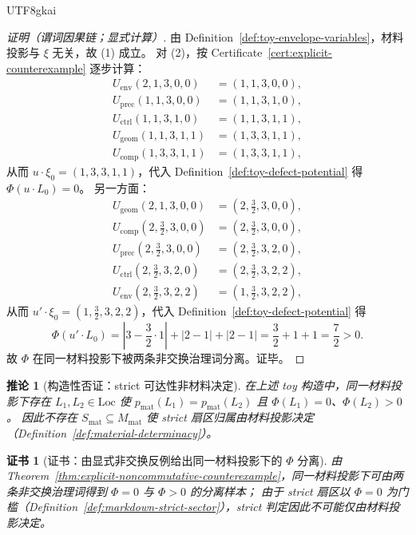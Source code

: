 \documentclass[12pt]{article}
\newtheorem{corollary}{推论}[section]
\newtheorem{certificate}{证书}[section]
\begin{document}
\begin{CJK*}{UTF8}{gkai}
\begin{proof}[证明（谓词因果链；显式计算）]
由 Definition~\ref{def:toy-envelope-variables}，材料投影与 $\xi$ 无关，故 (1) 成立。
对 (2)，按 Certificate~\ref{cert:explicit-counterexample} 逐步计算：
\[
\begin{aligned}
U_{\mathrm{env}}(2,1,3,0,0)&=(1,1,3,0,0),\\
U_{\mathrm{prec}}(1,1,3,0,0)&=(1,1,3,1,0),\\
U_{\mathrm{ctrl}}(1,1,3,1,0)&=(1,1,3,1,1),\\
U_{\mathrm{geom}}(1,1,3,1,1)&=(1,3,3,1,1),\\
U_{\mathrm{comp}}(1,3,3,1,1)&=(1,3,3,1,1),
\end{aligned}
\]
从而 $u\cdot \xi_0=(1,3,3,1,1)$，代入 Definition~\ref{def:toy-defect-potential} 得 $\Phi(u\cdot L_0)=0$。
另一方面：
\[
\begin{aligned}
U_{\mathrm{geom}}(2,1,3,0,0)&=\left(2,\frac{3}{2},3,0,0\right),\\
U_{\mathrm{comp}}\left(2,\frac{3}{2},3,0,0\right)&=\left(2,\frac{3}{2},3,0,0\right),\\
U_{\mathrm{prec}}\left(2,\frac{3}{2},3,0,0\right)&=\left(2,\frac{3}{2},3,2,0\right),\\
U_{\mathrm{ctrl}}\left(2,\frac{3}{2},3,2,0\right)&=\left(2,\frac{3}{2},3,2,2\right),\\
U_{\mathrm{env}}\left(2,\frac{3}{2},3,2,2\right)&=\left(1,\frac{3}{2},3,2,2\right),
\end{aligned}
\]
从而 $u'\cdot \xi_0=\left(1,\frac{3}{2},3,2,2\right)$，代入 Definition~\ref{def:toy-defect-potential} 得
\[
\Phi(u'\cdot L_0)=\left|3-\frac{3}{2}\cdot 1\right|+|2-1|+|2-1|=\frac{3}{2}+1+1=\frac{7}{2}>0.
\]
故 $\Phi$ 在同一材料投影下被两条非交换治理词分离。证毕。
\end{proof}

\begin{corollary}[构造性否证：strict 可达性非材料决定]
\label{cor:explicit-nonmaterial-determinacy}
在上述 toy 构造中，同一材料投影下存在 $L_1,L_2\in\mathrm{Loc}$ 使 $p_{\mathrm{mat}}(L_1)=p_{\mathrm{mat}}(L_2)$ 且
$\Phi(L_1)=0$、$\Phi(L_2)>0$。
因此不存在 $S_{\mathrm{mat}}\subseteq M_{\mathrm{mat}}$ 使 strict 扇区归属由材料投影决定（Definition~\ref{def:material-determinacy}）。
\end{corollary}

\begin{certificate}[证书：由显式非交换反例给出同一材料投影下的 $\Phi$ 分离]
\label{cert:explicit-nonmaterial-determinacy}
由 Theorem~\ref{thm:explicit-noncommutative-counterexample}，同一材料投影下可由两条非交换治理词得到 $\Phi=0$ 与 $\Phi>0$ 的分离样本；
由于 strict 扇区以 $\Phi=0$ 为门槛（Definition~\ref{def:markdown-strict-sector}），strict 判定因此不可能仅由材料投影决定。
\end{certificate}


\end{CJK*}
\end{document}

